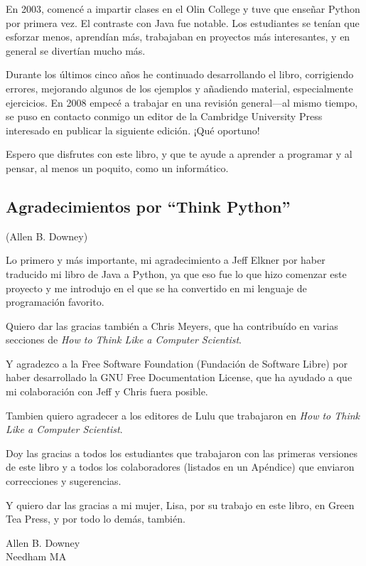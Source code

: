 En 2003, comencé a impartir clases en el Olin College y tuve que enseñar
Python por primera vez. El contraste con Java fue notable.
Los estudiantes se tenían que esforzar menos, aprendían más, trabajaban
en proyectos más interesantes, y en general se divertían mucho más.

Durante los últimos cinco años he continuado desarrollando el libro,
corrigiendo errores, mejorando algunos de los ejemplos y
añadiendo material, especialmente ejercicios. En 2008 empecé a trabajar
en una revisión general---al mismo tiempo, se puso en contacto conmigo
un editor de la Cambridge University Press interesado en publicar la
siguiente edición. ¡Qué oportuno!

Espero que disfrutes con este libro, y que te ayude
a aprender a programar y al pensar, al menos un poquito, como
un informático.

\subsection*{Agradecimientos por ``Think Python''}

(Allen B. Downey)

Lo primero y más importante, mi agradecimiento a Jeff Elkner por
haber traducido mi libro de Java a Python, ya que eso fue lo que hizo
comenzar este proyecto y me introdujo en el que se ha convertido
en mi lenguaje de programación favorito.

Quiero dar las gracias también a Chris Meyers, que ha contribuído en varias
secciones de \emph{How to Think Like a Computer Scientist}.

Y agradezco a la Free Software Foundation (Fundación de Software Libre) por
haber desarrollado la GNU Free Documentation License, que ha ayudado
a que mi colaboración con Jeff y Chris fuera posible.


Tambien quiero agradecer a los editores de Lulu que trabajaron en
\emph{How to Think Like a Computer Scientist}.

Doy las gracias a todos los estudiantes que trabajaron con las
primeras versiones de este libro y a todos los colaboradores (listados
en un Apéndice) que enviaron correcciones y sugerencias.

Y quiero dar las gracias a mi mujer, Lisa, por su trabajo en este libro, en Green
Tea Press, y por todo lo demás, también.

Allen B. Downey \\
Needham MA\\

